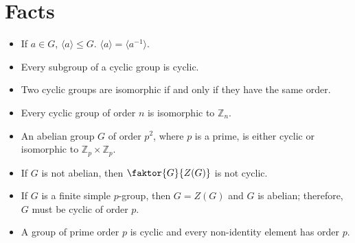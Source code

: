 \documentclass[12pt]{report}
\theoremstyle{definition}
\newcommand{\gen}[1]{{\langle}#1{\rangle}}
\begin{document}
\section{Facts}
\begin{itemize}
	\item If $a\in G$, $\gen{a}\leq G$. $\gen{a}=\gen{a^{-1}}$.
	\item Every subgroup of a cyclic group is cyclic.
	\item Two cyclic groups are isomorphic if and only if they have the same order.
	\item Every cyclic group of order $n$ is isomorphic to $\mathbb{Z}_n$.
	\item An abelian group $G$ of order $p^2$, where $p$ is a prime, is either cyclic or isomorphic to $\mathbb{Z}_p\times\mathbb{Z}_p$.
	\item If $G$ is not abelian, then $\faktor{G}{Z(G)}$ is not cyclic.
	\item If $G$ is a finite simple $p$-group, then $G=Z(G)$ and $G$ is abelian; therefore, $G$ must be cyclic of order $p$.
	\item A group of prime order $p$ is cyclic and every non-identity element has order $p$.
\end{itemize}
\end{document}
